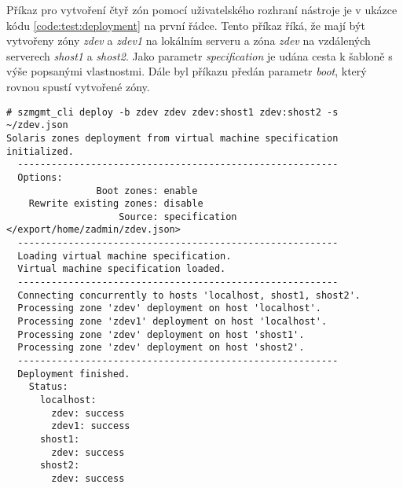 Příkaz pro vytvoření čtyř zón pomocí uživatelského rozhraní nástroje je v ukázce kódu \ref{code:test:deployment} na první řádce.
Tento příkaz říká, že mají být vytvořeny zóny \textit{zdev} a \textit{zdev1} na lokálním serveru a zóna \textit{zdev} na vzdálených
serverech \textit{shost1} a \textit{shost2}. Jako parametr \textit{specification} je udána cesta k šabloně s výše popsanými 
vlastnostmi. Dále byl příkazu předán parametr \textit{boot}, který rovnou spustí vytvořené zóny.
\begin{lstlisting}[basicstyle=\scriptsize\ttfamily, caption={Vytvoření neglobálních zón ze šablony}, float,label={code:test:deployment}]  
# szmgmt_cli deploy -b zdev zdev zdev:shost1 zdev:shost2 -s ~/zdev.json 
Solaris zones deployment from virtual machine specification initialized.
  ---------------------------------------------------------
  Options:
                Boot zones: enable
    Rewrite existing zones: disable
                    Source: specification </export/home/zadmin/zdev.json>
  ---------------------------------------------------------
  Loading virtual machine specification.
  Virtual machine specification loaded.
  ---------------------------------------------------------
  Connecting concurrently to hosts 'localhost, shost1, shost2'.
  Processing zone 'zdev' deployment on host 'localhost'.
  Processing zone 'zdev1' deployment on host 'localhost'.
  Processing zone 'zdev' deployment on host 'shost1'.
  Processing zone 'zdev' deployment on host 'shost2'.
  ---------------------------------------------------------
  Deployment finished.
    Status:
      localhost:
        zdev: success
        zdev1: success
      shost1:
        zdev: success
      shost2:
        zdev: success
\end{lstlisting}

